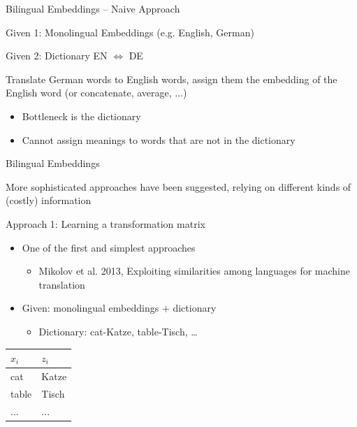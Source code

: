 \documentclass[12pt]{beamer}
\begin{document}
\begin{frame}{Bilingual Embeddings – Naive Approach}
	
Given 1: Monolingual Embeddings (e.g. English, German)

Given 2: Dictionary EN $\Leftrightarrow$ DE
	
Translate German words to English words, assign them the embedding of the English word (or concatenate, average, ...)


\begin{itemize}
	\item 	Bottleneck is the dictionary
	\item 	Cannot assign meanings to words that are not in the dictionary
\end{itemize}
	
	
\end{frame}


\begin{frame}{Bilingual Embeddings}
	
	More sophisticated approaches have been suggested, relying on different kinds of (costly) information
	
\end{frame}


\begin{frame}{Approach 1: Learning a transformation matrix}

\begin{itemize}
	\item One of the first and simplest approaches
	\begin{itemize}
		\item Mikolov et al. 2013, Exploiting similarities among languages for machine translation
	\end{itemize}
\end{itemize}

\begin{itemize}
	\item Given: monolingual embeddings + dictionary 
	\begin{itemize}
		\item Dictionary: cat-Katze, table-Tisch, …
	\end{itemize}
\end{itemize}

\begin{table}
\begin{tabular}{l|l}
$x_i$ & $z_i$ \\ \hline
cat & Katze \\ \hline
table & Tisch \\ \hline
... & ... \\
\end{tabular}
\end{table}

\end{frame}
\end{document}
